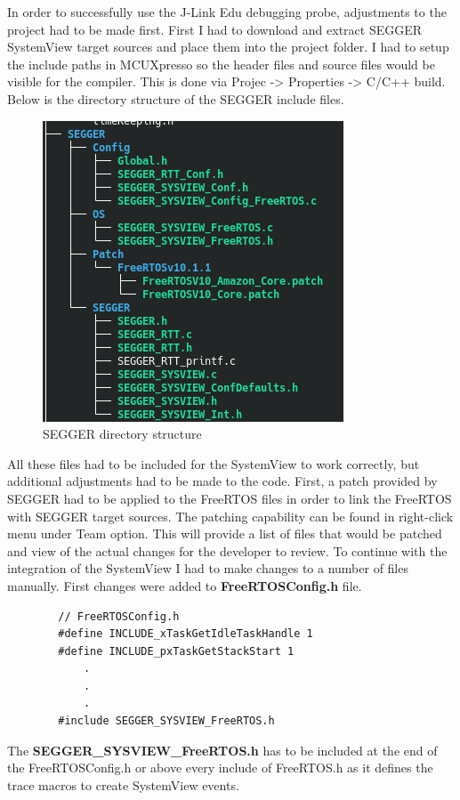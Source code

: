 \documentclass[12pt,a4paper]{article}
\begin{document}
		In order to successfully use the J-Link Edu debugging probe, adjustments to the project had to be made first.
		First I had to download and extract SEGGER SystemView target sources and place them into the project folder. I had to setup the include paths in MCUXpresso so the header files and source files would be visible for the compiler. This is done via Projec -> Properties -> C/C++ build. Below is the directory structure of the SEGGER include files.
		\begin{figure}[h]
            \centering
            \includegraphics[scale=1]{SEGGER_directory_structure}
            \caption{SEGGER directory structure}
		\end{figure}
		All these files had to be included for the SystemView to work correctly, but additional adjustments had to be made to the code. First, a patch provided by SEGGER had to be applied to the FreeRTOS files in order to link the FreeRTOS with SEGGER target sources. The patching capability can be found in right-click menu under Team option. This will provide a list of files that would be patched and view of the actual changes for the developer to review.
		To continue with the integration of the SystemView I had to make changes to a number of files manually. First changes were added to {\bfseries FreeRTOSConfig.h} file.
		\begin{lstlisting}
        // FreeRTOSConfig.h
        #define INCLUDE_xTaskGetIdleTaskHandle 1
        #define INCLUDE_pxTaskGetStackStart 1
            .
            .
            .
        #include SEGGER_SYSVIEW_FreeRTOS.h
		\end{lstlisting}
		The {\bfseries SEGGER\_SYSVIEW\_FreeRTOS.h} has to be included at the end of the FreeRTOSConfig.h or above every include of FreeRTOS.h as it defines the trace macros to create SystemView events.\\
\end{document}
